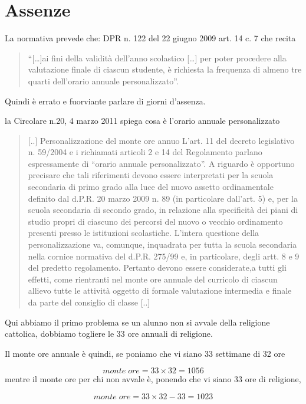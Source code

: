 \documentclass{article}
\begin{document}
\section*{Assenze}
La normativa prevede che: 	DPR n. 122 del 22 giugno 2009 art. 14 c. 7 che recita

\begin{quotation}

 “[…]ai fini della validità dell'anno scolastico
[…] per poter procedere alla valutazione finale di ciascun studente, 
è richiesta la frequenza di almeno tre
quarti dell'orario annuale personalizzato”.
\end{quotation}
Quindi è errato e fuorviante parlare di giorni d'assenza.

la Circolare n.20, 4 marzo 2011 spiega cosa è l'orario annuale personalizzato

	\begin{quotation}
		[..]
	Personalizzazione del monte ore annuo
	L’art. 11 del decreto legislativo n. 59/2004 e i richiamati articoli 
	2 e 14 del Regolamento
	parlano espressamente di “orario annuale personalizzato”.
	A riguardo è opportuno precisare che tali riferimenti devono essere interpretati per la scuola secondaria di primo grado 
	alla luce del nuovo assetto ordinamentale 
	definito dal d.P.R. 20 marzo
	2009 n. 89 (in particolare dall'art. 5) e, per la scuola 
	secondaria 
	di secondo grado, in relazione alla
	specificità dei piani di studio propri di ciascuno dei percorsi 
	del nuovo o vecchio ordinamento
	presenti presso le istituzioni scolastiche.
	L’intera questione della personalizzazione va, comunque, inquadrata
	 per tutta la scuola secondaria nella cornice normativa del d.P.R. 275/99 e,
	 in particolare, degli artt. 8 e 9 del predetto regolamento.
	Pertanto devono essere considerate,a tutti gli effetti, 
	come rientranti nel monte ore annuale del curricolo di ciascun 
	allievo tutte le attività 
	oggetto di formale valutazione intermedia e finale da
	parte del consiglio di classe 
	[..]
	\end{quotation}
Qui abbiamo il primo problema se un alunno non si avvale della religione cattolica, 
dobbiamo togliere le 33 ore annuali di religione.

Il monte ore annuale è quindi, se poniamo che vi siano 33 settimane di 32 ore

\[monte\; ore=33\times 32=1056\]
mentre il monte ore per chi non avvale è, ponendo che vi siano 33 ore di religione,

\[monte\; ore=33\times 32-33=1023\]
\end{document}
